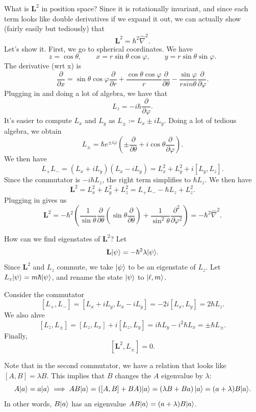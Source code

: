 What is $\mathbf{L} ^2$ in position space? Since it is rotationally invariant, and since each term looks like double derivatives if we expand it out, we can actually show (fairly easily but tediously) that
\[
	\mathbf{L} ^2= \hbar ^2 \hat{\nabla }^2
.\]
Let's show it. First, we go to spherical coordinates. We have
\[
	z=\cos \theta ,\qquad x=r \sin \theta \cos \varphi ,\qquad y=r \sin \theta \sin \varphi 
.\]
The derivative (wrt x) is
\[
	\frac{\partial }{\partial x} =\sin \theta \cos \varphi \frac{\partial }{\partial r} + \frac{\cos \theta \cos \varphi }{r} \frac{\partial }{\partial \theta } -\frac{\sin \varphi }{rsin\theta } \frac{\partial }{\partial \varphi } 
.\]
Plugging in and doing a lot of algebra, we have that
\[
	L_z = -i \hbar \frac{\partial }{\partial \varphi } 
.\]
It's easier to compute $L_x$ and $L_y$ as $L_{\pm} \coloneqq L_x \pm i L_y$. Doing a lot of tedious algebra, we obtain
\[
	L_{\pm} =\hbar e^{\pm i\varphi } \left( \pm \frac{\partial }{\partial \theta } +i \cos \theta \frac{\partial }{\partial \varphi }  \right) 
.\]
We then have
\[
	L_+L_-=\left(L_x+iL_y\right)(L_x-iL_y)=L_x^2+L_y^2+i\left[ L_y,L_z \right] 
.\]
Since the commutator is $-i\hbar L_z$, the right term simplifies to $\hbar L_z$. We then have
\[
	\mathbf{L} ^2=L_x^2+L_y^2+L_z^2=L_+L_- -\hbar L_z+L_z^2
.\]
Plugging in gives us
\[
	\mathbf{L} ^2=-\hbar ^2\left( \frac{1}{\sin \theta } \frac{\partial }{\partial \theta } \left( \sin \theta \frac{\partial }{\partial \theta }  \right) +\frac{1}{\sin ^2 \theta } \frac{\partial ^2}{\partial \varphi ^2}  \right) =-\hbar ^2 \hat{\nabla }^2
.\]

How can we find eigenstates of $\mathbf{L} ^2$? Let
\[
	 \mathbf{L} \lvert\psi \rangle =-\hbar ^2\lambda \lvert\psi \rangle 
.\]
Since $\mathbf{L} ^2$ and $L_z$ commute, we take $\lvert\psi \rangle $ to be an eigenstate of $L_z$. Let $L_z\lvert\psi \rangle =m\hbar \lvert\psi \rangle $, and rename the state $\lvert\psi \rangle $ to $\lvert\ell ,m\rangle $.

Consider the commutator
\[
	\left[ L_+,L_- \right] =\left[ L_x+iL_y,L_x-iL_y \right] =-2i\left[ L_x,L_y \right] =2\hbar L_z
.\]
We also ahve
\[
	\left[ L_z,L_{\pm}  \right] =\left[ L_z,L_x \right] +i\left[ L_z,L_y \right] =i\hbar L_y-i^2\hbar L_x=\pm \hbar L_{\pm} 
.\]
Finally,
\[
	\left[ \mathbf{L} ^2,L_{\pm}  \right] =0
.\]

Note that in the second commutator, we have a relation that looks like $\left[ A,B \right] =\lambda B$. This implies that $B$ changes the $A$ eigenvalue by $\lambda $:
\[
	A\lvert a\rangle =a\lvert a\rangle \implies AB\lvert a\rangle =([A,B]+BA)\lvert a\rangle =\left( \lambda B+Ba \right) \lvert a\rangle =(a+\lambda )B\lvert a\rangle 
.\]
In other words, $B\lvert a\rangle $ has an eigenvalue $AB\lvert a\rangle =(a+\lambda )B\lvert a\rangle $.


